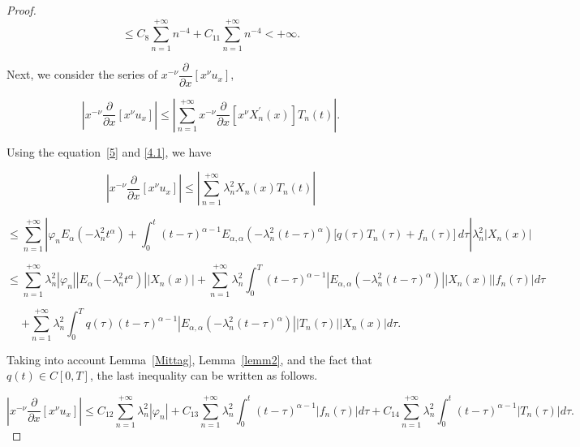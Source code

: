 \documentclass[reqno]{amsart}
\theoremstyle{definition}
\numberwithin{equation}{section}
\begin{document}
\begin{proof}
\begin{equation*}
    \leq C_{8}\sum_{n=1}^{+\infty}n^{-4}+C_{11}\sum_{n=1}^{+\infty}n^{-4}< +\infty.
\end{equation*}

Next, we consider the series of $x^{-\nu}\dfrac{\partial}{\partial x}\left[x^{\nu}u_x\right]$,

\begin{equation*}
    \left|x^{-\nu}\dfrac{\partial}{\partial x}\left[x^{\nu}u_x\right]\right|\leq \left|\sum_{n=1}^{+\infty}x^{-\nu}\dfrac{\partial}{\partial x}\left[x^{\nu}X_n^{\prime}(x)\right]T_n(t)\right|.
\end{equation*}

Using the equation~\eqref{5} and \eqref{4.1}, we have 

\begin{equation*}
    \left|x^{-\nu}\dfrac{\partial}{\partial x}\left[x^{\nu}u_x\right]\right|\leq \left|\sum_{n=1}^{+\infty}\lambda_n^2X_n(x)T_n(t)\right|
\end{equation*}

\begin{equation*}
    \leq \sum_{n=1}^{+\infty}\left|\varphi_n E_{\alpha}\!\left(-\lambda_n^2 t^{\alpha}\right)
+
\int_0^t
(t-\tau)^{\alpha-1}
E_{\alpha,\alpha}\!\left(-\lambda_n^2 (t-\tau)^{\alpha}\right)
\big[q(\tau)T_n(\tau)+f_n(\tau)\big]
\, d\tau\right| \lambda_n^2|X_n(x)|
\end{equation*}

\begin{equation*}
    \leq\sum_{n=1}^{+\infty}\lambda_n^2\left|\varphi_n\right|\left|E_{\alpha}\left(-\lambda_n^{2}t^\alpha\right)\right||X_n(x)|+\sum_{n=1}^{+\infty}\lambda_n^2\int_0^T(t-\tau)^{\alpha-1}\left|E_{\alpha,\alpha}(-\lambda_n^2(t-\tau)^{\alpha})\right||X_n(x)||f_n(\tau)|d\tau
\end{equation*}

\begin{equation*}
    +\sum_{n=1}^{+\infty}\lambda_n^2\int_0^Tq(\tau)(t-\tau)^{\alpha-1}\left|E_{\alpha,\alpha}\left(-\lambda_n^2(t-\tau)^{\alpha}\right)\right|\left|T_n(\tau)\right||X_n(x)|d\tau.
\end{equation*}

Taking into account Lemma~\ref{Mittag}, Lemma~\ref{lemm2}, and the fact that $q(t)\in C[0,T]$, the last inequality can be written as follows.

\begin{equation*}
    \left|x^{-\nu}\dfrac{\partial}{\partial x}\left[x^{\nu}u_x\right]\right|\leq C_{12}\sum_{n=1}^{+\infty}\lambda_n^2\left|\varphi_n\right|+C_{13}\sum_{n=1}^{+\infty}\lambda_n^2\int_0^t(t-\tau)^{\alpha-1}|f_n(\tau)|d\tau+C_{14}\sum_{n=1}^{+\infty}\lambda_n^2\int_0^t(t-\tau)^{\alpha-1}\left|T_n(\tau)\right|d\tau.
\end{equation*}


\end{proof}
\end{document}
